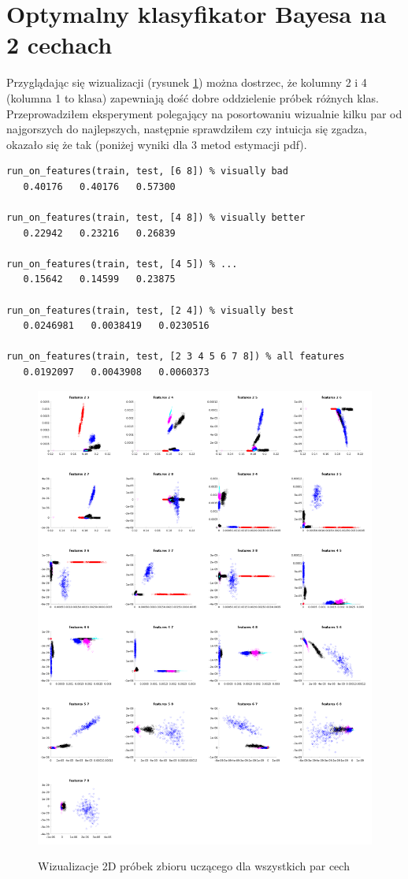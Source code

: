 \documentclass[a4paper]{article}
\begin{document}
\section{Optymalny klasyfikator Bayesa na 2 cechach}
Przyglądając się wizualizacji (rysunek \ref{fig:2D}) można dostrzec,
że kolumny 2 i 4 (kolumna 1 to klasa) zapewniają dość dobre oddzielenie próbek różnych klas.
Przeprowadziłem eksperyment polegający na posortowaniu wizualnie kilku par od najgorszych do najlepszych,
następnie sprawdziłem czy intuicja się zgadza, okazało się że tak
(poniżej wyniki dla 3 metod estymacji pdf).

\begin{verbatim}
run_on_features(train, test, [6 8]) % visually bad
   0.40176   0.40176   0.57300

run_on_features(train, test, [4 8]) % visually better
   0.22942   0.23216   0.26839

run_on_features(train, test, [4 5]) % ...
   0.15642   0.14599   0.23875

run_on_features(train, test, [2 4]) % visually best
   0.0246981   0.0038419   0.0230516

run_on_features(train, test, [2 3 4 5 6 7 8]) % all features
   0.0192097   0.0043908   0.0060373
\end{verbatim}
\begin{figure}[h]
    \caption[]{Wizualizacje 2D próbek zbioru uczącego dla wszystkich par cech}
    \centering
    \includegraphics[width=1.0\textwidth]{2features.png}
    \label{fig:2D}
\end{figure}
\end{document}
